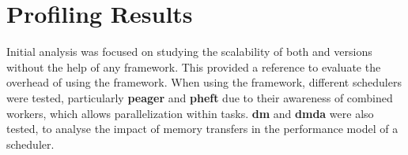 \documentclass[main.tex]{subfiles}
\begin{document}
\chapter{Profiling Results} \label{chapter:results}


Initial analysis was focused on studying the scalability of both \cpu and \cuda versions without the help of any framework. This provided a reference to evaluate the overhead of using the framework. When using the \starpu framework, different schedulers were tested, particularly \textbf{peager} and \textbf{pheft} due to their awareness of combined workers, which allows \openmp parallelization within \cpu tasks. \textbf{dm} and \textbf{dmda} were also tested, to analyse the impact of memory transfers in the performance model of a scheduler.




%


\end{document}
